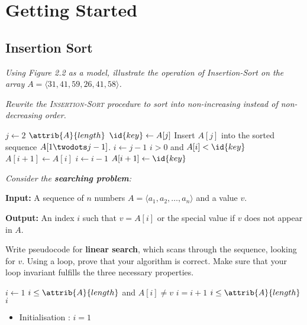\section{Getting Started}

\subsection{Insertion Sort}

\begin{description}

   {\itshape Using Figure 2.2 as a model, illustrate the operation of {\sc Insertion-Sort} on the array $A = \langle 31, 41, 59, 26, 41, 58 \rangle$.}

    \begin{exrev}
      
    \end{exrev}

 {\itshape Rewrite the {\scshape Insertion-Sort} procedure to sort into non-increasing instead of non-decreasing order.}
    \begin{ex}
\begin{codebox}
  \li \For $j \gets 2$ \To $\attrib{A}{length}$
  \li \Do
  $\id{key} \gets A[j]$
  \li \Comment Insert $A[j]$ into the sorted sequence
  $A[1 \twodots j-1]$.
  \li $i \gets j-1$
  \li \While $i > 0$ and $A[i] < \id{key}$
  \li \Do
  $A[i+1] \gets A[i]$
  \li $i \gets i-1$
  \End
  \li $A[i+1] \gets \id{key}$
  \End
\end{codebox}
\end{ex}


 {\itshape Consider the {\bfseries searching problem}:

  {\bfseries Input:} A sequence of $n$ numbers $A = \langle a_1, a_2, \ldots, a_n \rangle$ and a value $v$.

  {\bfseries Output:} An index $i$ such that $v = A[i]$ or the special value  if $v$ does not appear in $A$.

Write pseudocode for {\bfseries linear search}, which scans through the sequence, looking for $v$. Using a loop, prove that your algorithm is correct. Make sure that your loop invariant fulfills the three necessary properties.}
  \begin{ex}
  \begin{codebox}
    \li $i\gets1$
    \li \While $i \le \attrib{A}{length}$ and $A[i]\ne v$
    \li \Do $i = i+1$ \End
    \li \If $i \le \attrib{A}{length}$ 
    \li \Then \Return $i$
    \li \Else
    \li \Return {}
    \End
    \end{codebox}
\begin{itemize}
  \item Initialisation : $i = 1$


\end{itemize}
\end{ex}
\end{description}

